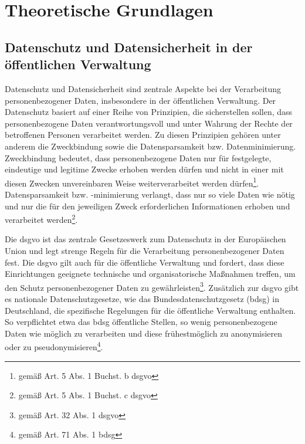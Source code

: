 \chapter{Theoretische Grundlagen}
\label{cha:theorie}

\section{Datenschutz und Datensicherheit in der öffentlichen Verwaltung}
\label{sec:datenschutz-verwaltung}
\begin{spacing}{1.5}

Datenschutz und Datensicherheit sind zentrale Aspekte bei der Verarbeitung personenbezogener Daten, insbesondere in der öffentlichen Verwaltung. Der Datenschutz basiert auf einer Reihe von Prinzipien, die sicherstellen sollen, dass personenbezogene Daten verantwortungsvoll und unter Wahrung der Rechte der betroffenen Personen verarbeitet werden. Zu diesen Prinzipien gehören unter anderem die Zweckbindung sowie die Datensparsamkeit bzw. Datenminimierung. Zweckbindung bedeutet, dass personenbezogene Daten nur für festgelegte, eindeutige und legitime Zwecke erhoben werden dürfen und nicht in einer mit diesen Zwecken unvereinbaren Weise weiterverarbeitet werden dürfen\footnote{gemäß Art. 5 Abs. 1 Buchst. b \acrshort{dsgvo}}. Datensparsamkeit bzw. -minimierung verlangt, dass nur so viele Daten wie nötig und nur die für den jeweiligen Zweck erforderlichen Informationen erhoben und verarbeitet werden\footnote{gemäß Art. 5 Abs. 1 Buchst. c \acrshort{dsgvo}}.

Die \acrshort{dsgvo} ist das zentrale Gesetzeswerk zum Datenschutz in der Europäischen Union und legt strenge Regeln für die Verarbeitung personenbezogener Daten fest. Die \acrshort{dsgvo} gilt auch für die öffentliche Verwaltung und fordert, dass diese Einrichtungen geeignete technische und organisatorische Maßnahmen treffen, um den Schutz personenbezogener Daten zu gewährleisten\footnote{gemäß Art. 32 Abs. 1 \acrshort{dsgvo}}. Zusätzlich zur \acrshort{dsgvo} gibt es nationale Datenschutzgesetze, wie das Bundesdatenschutzgesetz (\acrshort{bdsg}) in Deutschland, die spezifische Regelungen für die öffentliche Verwaltung enthalten. So verpflichtet etwa das \acrshort{bdsg} öffentliche Stellen, so wenig personenbezogene Daten wie möglich zu verarbeiten und diese frühestmöglich zu anonymisieren oder zu pseudonymisieren\footnote{gemäß Art. 71 Abs. 1 \acrshort{bdsg}}.


\end{spacing}
